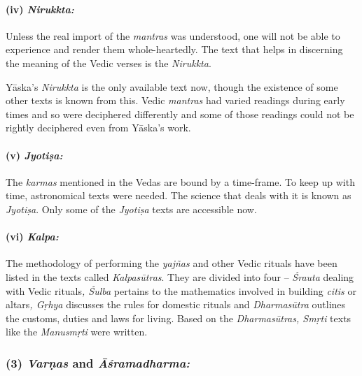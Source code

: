 \paragraph*{(iv) \textit{Nirukkta:}}

\vskip -7.3pt

Unless the real import of the \textit{mantras} was understood, one will not be able to experience and render them whole-heartedly. The text that helps in discerning the meaning of the Vedic verses is the \textit{Nirukkta}.

Yāska’s \textit{Nirukkta} is the only available text now, though the existence of some other texts is known from this. Vedic \textit{mantras} had varied readings during early times and so were deciphered differently and some of those readings could not be rightly deciphered even from Yāska’s work.


\paragraph*{(v) \textit{Jyotiṣa:}}

\vskip -7.3pt

The \textit{karmas} mentioned in the Vedas are bound by a time-frame. To keep up with time, astronomical texts were needed. The science that deals with it is known as \textit{Jyotiṣa}. Only some of the \textit{Jyotiṣa} texts are accessible now.


\paragraph*{(vi) \textit{Kalpa:}}

\vskip -7.3pt

The methodology of performing the \textit{yajñas} and other Vedic rituals have been listed in the texts called \textit{Kalpasūtras}. They are divided into four – \textit{Śrauta} dealing with Vedic rituals\textit{, Śulba} pertains to the mathematics involved in building \textit{citis} or altars\textit{, Gṛhya} discusses the rules for domestic rituals and \textit{Dharmasūtra} outlines the customs, duties and laws for living. Based on the \textit{Dharmasūtras, Smṛti} texts like the \textit{Manusmṛti} were written.


\subsubsection*{(3) \textit{Varṇas} and \textit{Āśramadharma:}}

\vskip -7pt

